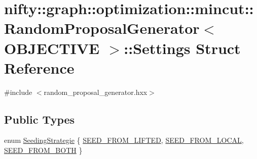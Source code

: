\hypertarget{structnifty_1_1graph_1_1optimization_1_1mincut_1_1RandomProposalGenerator_1_1Settings}{}\section{nifty\+:\+:graph\+:\+:optimization\+:\+:mincut\+:\+:Random\+Proposal\+Generator$<$ O\+B\+J\+E\+C\+T\+I\+V\+E $>$\+:\+:Settings Struct Reference}
\label{structnifty_1_1graph_1_1optimization_1_1mincut_1_1RandomProposalGenerator_1_1Settings}


{\ttfamily \#include $<$random\+\_\+proposal\+\_\+generator.\+hxx$>$}

\subsection*{Public Types}
\begin{DoxyCompactItemize}
\item 
enum \hyperlink{structnifty_1_1graph_1_1optimization_1_1mincut_1_1RandomProposalGenerator_1_1Settings_a0f11baa84ffd3c3e6fe1f0be321d583d}{Seeding\+Strategie} \{ \hyperlink{structnifty_1_1graph_1_1optimization_1_1mincut_1_1RandomProposalGenerator_1_1Settings_a0f11baa84ffd3c3e6fe1f0be321d583da03e5cd1c78ffd59a98faec3be73e8957}{S\+E\+E\+D\+\_\+\+F\+R\+O\+M\+\_\+\+L\+I\+F\+T\+E\+D}, 
\hyperlink{structnifty_1_1graph_1_1optimization_1_1mincut_1_1RandomProposalGenerator_1_1Settings_a0f11baa84ffd3c3e6fe1f0be321d583daa1d57df41ee3c7cbef48543cfce0fedf}{S\+E\+E\+D\+\_\+\+F\+R\+O\+M\+\_\+\+L\+O\+C\+A\+L}, 
\hyperlink{structnifty_1_1graph_1_1optimization_1_1mincut_1_1RandomProposalGenerator_1_1Settings_a0f11baa84ffd3c3e6fe1f0be321d583daff0accbf7fba396a37292f04a88b0c3e}{S\+E\+E\+D\+\_\+\+F\+R\+O\+M\+\_\+\+B\+O\+T\+H}
 \}
\end{DoxyCompactItemize}

